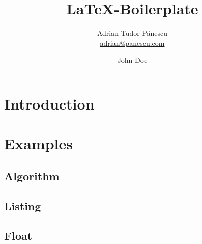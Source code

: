 \documentclass[12pt,a4paper,twoside]{report}
\author{
    Adrian-Tudor P\u{a}nescu \\
    \href{mailto:adrian@panescu.com}{adrian@panescu.com}
  \and
    John Doe
}
\title{\LaTeX-Boilerplate}
\date{}  %
\begin{document}
  

  

  \setcounter{page}{3}


  \begin{abstract}
    
  \end{abstract}

  \tableofcontents
  \listoffigures
  \listoftables
  \listofalgorithms

  \cleardoublepage


  \chapter{Introduction}
    \label{sec:intro}
    

  \cleardoublepage

  \chapter{Examples}
    \label{sec:ex}
    

    \FloatBarrier

    \section{Algorithm}
      \label{sec:algo}
      

    \clearpage

    \section{Listing}
      \label{sec:lst}
      

    \clearpage

    \section{Float}
      \label{sec:float}
      

      \FloatBarrier
\end{document}
